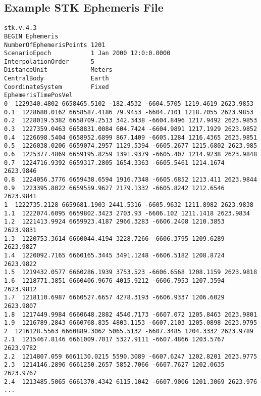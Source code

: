 \subsection{Example STK Ephemeris File}\label{app:efile}
\begin{verbatim}
stk.v.4.3
BEGIN Ephemeris
NumberOfEphemerisPoints 1201
ScenarioEpoch           1 Jan 2000 12:0:0.0000
InterpolationOrder      5
DistanceUnit            Meters
CentralBody             Earth
CoordinateSystem        Fixed
EphemerisTimePosVel
0  1229340.4802 6658465.5102 -182.4532 -6604.5705 1219.4619 2623.9853
0.1  1228680.0162 6658587.4186 79.9453 -6604.7101 1218.7055 2623.9853
0.2  1228019.5382 6658709.2513 342.3438 -6604.8496 1217.9492 2623.9853
0.3  1227359.0463 6658831.0084 604.7424 -6604.9891 1217.1929 2623.9852
0.4  1226698.5404 6658952.6899 867.1409 -6605.1284 1216.4365 2623.9851
0.5  1226038.0206 6659074.2957 1129.5394 -6605.2677 1215.6802 2623.985
0.6  1225377.4869 6659195.8259 1391.9379 -6605.407 1214.9238 2623.9848
0.7  1224716.9392 6659317.2805 1654.3363 -6605.5461 1214.1674 2623.9846
0.8  1224056.3776 6659438.6594 1916.7348 -6605.6852 1213.411 2623.9844
0.9  1223395.8022 6659559.9627 2179.1332 -6605.8242 1212.6546 2623.9841
1  1222735.2128 6659681.1903 2441.5316 -6605.9632 1211.8982 2623.9838
1.1  1222074.6095 6659802.3423 2703.93 -6606.102 1211.1418 2623.9834
1.2  1221413.9924 6659923.4187 2966.3283 -6606.2408 1210.3853 2623.9831
1.3  1220753.3614 6660044.4194 3228.7266 -6606.3795 1209.6289 2623.9827
1.4  1220092.7165 6660165.3445 3491.1248 -6606.5182 1208.8724 2623.9822
1.5  1219432.0577 6660286.1939 3753.523 -6606.6568 1208.1159 2623.9818
1.6  1218771.3851 6660406.9676 4015.9212 -6606.7953 1207.3594 2623.9812
1.7  1218110.6987 6660527.6657 4278.3193 -6606.9337 1206.6029 2623.9807
1.8  1217449.9984 6660648.2882 4540.7173 -6607.072 1205.8463 2623.9801
1.9  1216789.2843 6660768.835 4803.1153 -6607.2103 1205.0898 2623.9795
2  1216128.5563 6660889.3062 5065.5132 -6607.3485 1204.3332 2623.9789
2.1  1215467.8146 6661009.7017 5327.9111 -6607.4866 1203.5767 2623.9782
2.2  1214807.059 6661130.0215 5590.3089 -6607.6247 1202.8201 2623.9775
2.3  1214146.2896 6661250.2657 5852.7066 -6607.7627 1202.0635 2623.9767
2.4  1213485.5065 6661370.4342 6115.1042 -6607.9006 1201.3069 2623.976
...
\end{verbatim}


